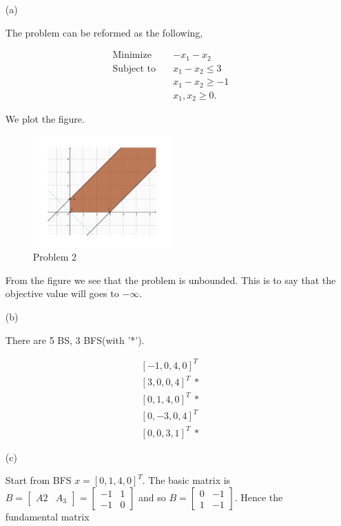\documentclass[12pt]{article}
\begin{document}
\begin{enumerate}

\item[(a)]

The problem can be reformed as the following,

$$
\begin{aligned}
\text{Minimize} \quad & -x_1-x_2 \\
\text{Subject to} \quad & x_1 - x_2 \leqslant 3 \\
& x_1 - x_2 \geqslant -1\\
& x_1, x_2 \geqslant 0. 
\end{aligned}
$$

We plot the figure.

\begin{figure}[htbp]
  \caption{Problem 2}
  \centering
    \includegraphics[width=0.5\textwidth]{p2.pdf}
\end{figure}

\FloatBarrier

From the figure we see that the problem is unbounded. This is to say that the objective value will goes to $-\infty$.

\item[(b)]

There are 5 BS, 3 BFS(with '*').

$$
\begin{aligned}
[-1, 0, 4, 0]^T \\
[3, 0, 0, 4]^T \ *\\
[0, 1, 4, 0]^T \ *\\
[0, -3, 0, 4]^T \\
[0, 0, 3, 1]^T \ * 
\end{aligned}
$$



\item[(c)]

Start from BFS $x = [0, 1, 4, 0]^T $. The basic matrix is $B = \begin{bmatrix}
A2 & A_3 
\end{bmatrix} = \begin{bmatrix}
-1 & 1 \\
-1 & 0 
\end{bmatrix}$ and so $B  = \begin{bmatrix}
0 & -1 \\
1 & -1 
\end{bmatrix}$. Hence the fundamental matrix 


\end{enumerate}
\end{document}
